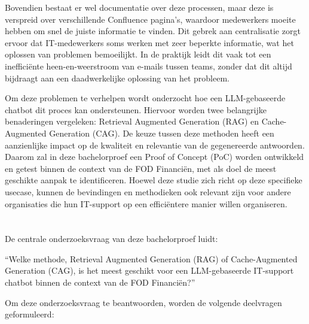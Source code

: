 Bovendien bestaat er wel documentatie over deze processen, maar deze is verspreid over verschillende Confluence pagina’s, waardoor medewerkers moeite hebben om snel de juiste informatie te vinden. Dit gebrek aan centralisatie zorgt ervoor dat IT-medewerkers soms werken met zeer beperkte informatie, wat het oplossen van problemen bemoeilijkt. In de praktijk leidt dit vaak tot een inefficiënte heen-en-weerstroom van e-mails tussen teams, zonder dat dit altijd bijdraagt aan een daadwerkelijke oplossing van het probleem.

Om deze problemen te verhelpen wordt onderzocht hoe een LLM-gebaseerde chatbot dit proces kan ondersteunen. Hiervoor worden twee belangrijke benaderingen vergeleken: Retrieval Augmented Generation (RAG) en Cache-Augmented Generation (CAG). De keuze tussen deze methoden heeft een aanzienlijke impact op de kwaliteit en relevantie van de gegenereerde antwoorden. Daarom zal in deze bachelorproef een Proof of Concept (PoC) worden ontwikkeld en getest binnen de context van de FOD Financiën, met als doel de meest geschikte aanpak te identificeren. Hoewel deze studie zich richt op deze specifieke usecase, kunnen de bevindingen en methodieken ook relevant zijn voor andere organisaties die hun IT-support op een efficiëntere manier willen organiseren.

\section{}%
\label{sec:onderzoeksvraag}

De centrale onderzoeksvraag van deze bachelorproef luidt:

“{Welke methode, Retrieval Augmented Generation (RAG) of Cache-Augmented Generation (CAG), is het meest geschikt voor een LLM-gebaseerde IT-support chatbot binnen de context van de FOD Financiën?}”

Om deze onderzoeksvraag te beantwoorden, worden de volgende deelvragen geformuleerd:

